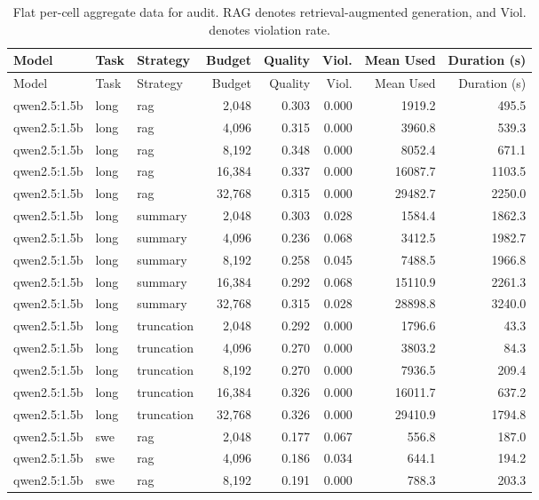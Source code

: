 \begin{longtable}{lllrrrrr}
\caption{Flat per-cell aggregate data for audit.  RAG denotes retrieval-augmented generation, and Viol. denotes violation rate.}\label{tab:app_flat_audit}\\
\toprule
Model & Task & Strategy & Budget & Quality & Viol. & Mean Used & Duration (s) \\
\midrule
\endfirsthead
\toprule
Model & Task & Strategy & Budget & Quality & Viol. & Mean Used & Duration (s) \\
\midrule
\endhead
qwen2.5:1.5b & long & rag & 2,048 & 0.303 & 0.000 & 1919.2 & 495.5 \\
qwen2.5:1.5b & long & rag & 4,096 & 0.315 & 0.000 & 3960.8 & 539.3 \\
qwen2.5:1.5b & long & rag & 8,192 & 0.348 & 0.000 & 8052.4 & 671.1 \\
qwen2.5:1.5b & long & rag & 16,384 & 0.337 & 0.000 & 16087.7 & 1103.5 \\
qwen2.5:1.5b & long & rag & 32,768 & 0.315 & 0.000 & 29482.7 & 2250.0 \\
qwen2.5:1.5b & long & summary & 2,048 & 0.303 & 0.028 & 1584.4 & 1862.3 \\
qwen2.5:1.5b & long & summary & 4,096 & 0.236 & 0.068 & 3412.5 & 1982.7 \\
qwen2.5:1.5b & long & summary & 8,192 & 0.258 & 0.045 & 7488.5 & 1966.8 \\
qwen2.5:1.5b & long & summary & 16,384 & 0.292 & 0.068 & 15110.9 & 2261.3 \\
qwen2.5:1.5b & long & summary & 32,768 & 0.315 & 0.028 & 28898.8 & 3240.0 \\
qwen2.5:1.5b & long & truncation & 2,048 & 0.292 & 0.000 & 1796.6 & 43.3 \\
qwen2.5:1.5b & long & truncation & 4,096 & 0.270 & 0.000 & 3803.2 & 84.3 \\
qwen2.5:1.5b & long & truncation & 8,192 & 0.270 & 0.000 & 7936.5 & 209.4 \\
qwen2.5:1.5b & long & truncation & 16,384 & 0.326 & 0.000 & 16011.7 & 637.2 \\
qwen2.5:1.5b & long & truncation & 32,768 & 0.326 & 0.000 & 29410.9 & 1794.8 \\
qwen2.5:1.5b & swe & rag & 2,048 & 0.177 & 0.067 & 556.8 & 187.0 \\
qwen2.5:1.5b & swe & rag & 4,096 & 0.186 & 0.034 & 644.1 & 194.2 \\
qwen2.5:1.5b & swe & rag & 8,192 & 0.191 & 0.000 & 788.3 & 203.3 \\

\end{longtable}
